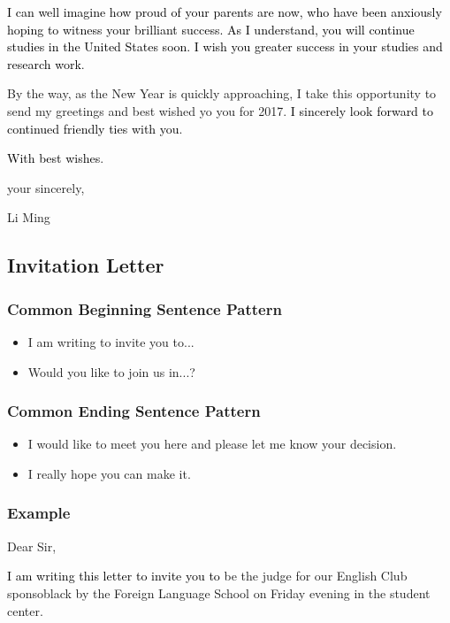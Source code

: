 \documentclass{article}
\begin{document}
\par \textcolor{black}{I can well imagine how proud of your parents are now, who have been
  anxiously hoping to witness your brilliant success. As I understand, you will continue
  studies in the United States soon. I wish you greater success in your studies and
  research work}.

\par By the way, as the New Year is quickly approaching, I take this opportunity to send my
greetings and best wished yo you for 2017. \textcolor{black}{I sincerely look forward to
  continued friendly ties with you}.

\par \textcolor{black}{With best wishes}.

\hfill your sincerely,

\hfill Li Ming 


\subsection{Invitation Letter}
\label{sec:letter}

\subsubsection{Common Beginning Sentence Pattern}
\label{sec:comm-begnn-sent}
\begin{itemize}
\item I am writing to invite you to...
\item Would you like to join us in...?
\end{itemize}

\subsubsection{Common Ending Sentence Pattern}
\label{sec:comm-ending-sent-2}
\begin{itemize}
\item I would like to meet you here and please let me know your decision.
\item I really hope you can make it.
\end{itemize}

\subsubsection{Example}
\label{sec:example-2}
Dear Sir,
\par \textcolor{black}{I am writing this letter to invite you to }be the judge for our
English Club sponsoblack by the Foreign Language School on Friday evening in the student
center.
\end{document}
